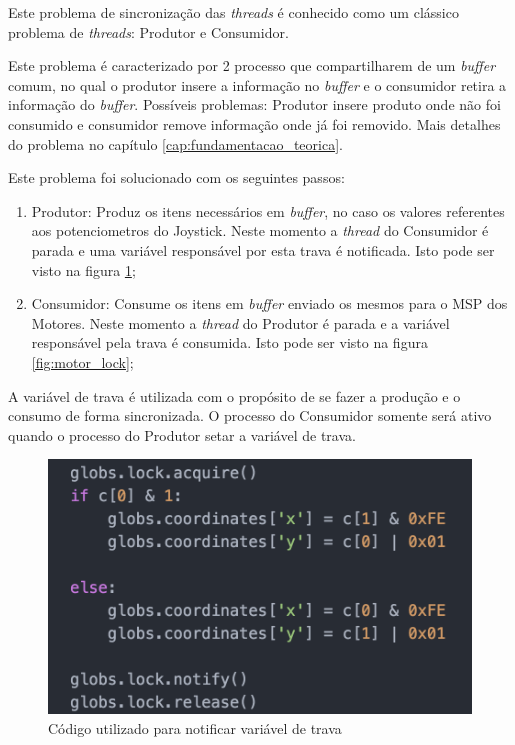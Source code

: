   Este problema de sincronização das \textit{threads} é conhecido como um clássico problema de \textit{threads}: Produtor e Consumidor.

  Este problema é caracterizado por 2 processo que compartilharem de um \textit{buffer} comum, no qual o produtor insere a informação no \textit{buffer} e o consumidor retira a informação do \textit{buffer}. Possíveis problemas: Produtor insere produto onde não foi consumido e consumidor remove informação onde já foi removido. Mais detalhes do problema no capítulo \ref{cap:fundamentacao_teorica}.

  Este problema foi solucionado com os seguintes passos:
  \begin{enumerate}
    \item Produtor: Produz os itens necessários em \textit{buffer}, no caso os valores referentes aos potenciometros do Joystick. Neste momento a \textit{thread} do Consumidor é parada e uma variável responsável por esta trava é notificada. Isto pode ser visto na figura \ref{fig:joy_lock};
    \item Consumidor: Consume os itens em \textit{buffer} enviado os mesmos para o MSP dos Motores. Neste momento a \textit{thread} do Produtor é parada e a variável responsável pela trava é consumida. Isto pode ser visto na figura \ref{fig:motor_lock};
  \end{enumerate}

  A variável de trava é utilizada com o propósito de se fazer a produção e o consumo de forma sincronizada. O processo do Consumidor somente será ativo quando o processo do Produtor setar a variável de trava.

  \begin{figure}[!htb]
  \centering
  \includegraphics[keepaspectratio=true,scale=0.5]{figuras/resultados/joy_lock}
  \caption{Código utilizado para notificar variável de trava}
  \label{fig:joy_lock}
  \end{figure}

